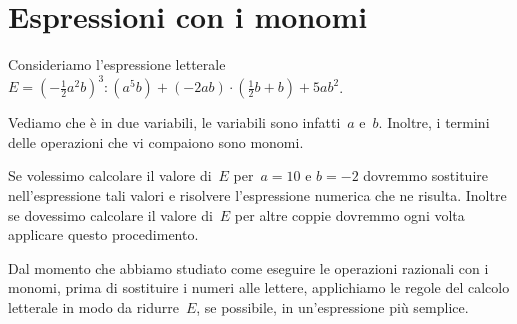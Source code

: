 \ovalbox{\risolvii \ref{ese:10.25}, \ref{ese:10.26}, \ref{ese:10.27}, \ref{ese:10.28}, \ref{ese:10.29}, \ref{ese:10.30}, \ref{ese:10.31}}

\section{Espressioni con i monomi}
Consideriamo l'espressione letterale
$E=\left(-{\frac{1}{2}}a^{2}b\right)^{3}:(a^{5}b)+(-2ab)\cdot\left(\frac{1}{2}b+b\right)+5ab^{2}$.

Vediamo che è in due variabili, le variabili sono infatti~$a$ e~$b$. Inoltre, i termini delle operazioni che vi compaiono sono monomi.

Se volessimo calcolare il valore di~$E$ per~$a = 10$ e $b = -2$ dovremmo
sostituire nell'espressione tali valori e risolvere
l'espressione numerica che ne risulta. Inoltre se
dovessimo calcolare il valore di~$E$ per altre coppie dovremmo ogni volta
applicare questo procedimento.

Dal momento che abbiamo studiato come eseguire le operazioni razionali
con i monomi, prima di sostituire i numeri alle lettere, applichiamo le
regole del calcolo letterale in modo da ridurre~$E$, se possibile,
in un'espressione più semplice.

